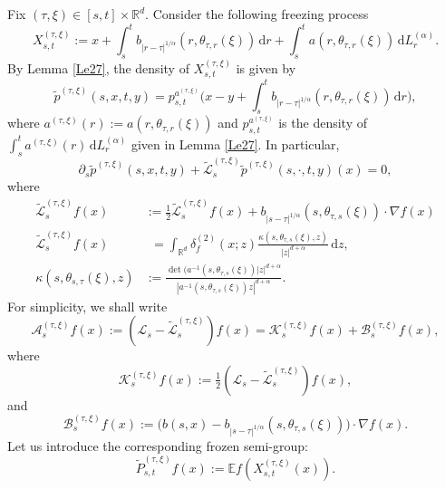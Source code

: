 \documentclass[11pt]{article}
\numberwithin{equation}{section}\providecommand{\asymp}{\mathrel{\sim}}
\theoremstyle{plain}
\theoremstyle{definition}
\let\p\partial
\let\wt\widetilde
\newcommand\cL{{\mathcal L}}
\newcommand\mE{\mathbb{E}}
\newcommand\mR{\mathbb{R}}
\newcommand\1{{\mathbf{1}}}
\newcommand\sA{{\mathscr A}}
\newcommand\sB{{\mathscr B}}
\newcommand\sK{{\mathscr K}}
\newcommand\sL{{\mathscr L}}
\newcommand{\dif}{\,\mathrm{d}}
\begin{document}
Fix $(\tau,\xi)\in[s,t]\times\mR^d$. Consider the following freezing process
\[
X^{(\tau,\xi)}_{s,t}:=x+\int^t_s b_{|r-\tau|^{1/\alpha}}(r, \theta_{\tau,r}(\xi))\dif r+\int^t_s a(r, \theta_{\tau,r}(\xi))\dif L^{(\alpha)}_r.
\]
By Lemma \ref{Le27}, the density of $X^{(\tau,\xi)}_{s,t}$ is given by
\begin{equation}\label{KP8}
\tilde p^{(\tau,\xi)}(s,x,t,y)= p_{s,t}^{a^{(\tau,\xi)}}\biggl(x-y+\int^t_s b_{|r-\tau|^{1/\alpha}}(r, \theta_{\tau,r}(\xi))\dif r\biggr),
\end{equation}
where $a^{(\tau,\xi)}(r):=a(r,\theta_{\tau,r}(\xi)) $ and $p_{s,t}^{a^{(\tau,\xi)}}$ is the density of $\int^t_s a^{(\tau,\xi)}(r)\dif L^{(\alpha)}_r$
given in Lemma \ref{Le27}. In particular,
\begin{equation}\label{KOLMO_FREEZE}
\p_s \tilde p^{(\tau,\xi)}(s,x,t,y)+{\tilde \sL}^{(\tau,\xi)}_s{\tilde p}^{(\tau,\xi)}(s,\cdot,t,y)(x)=0,
\end{equation}
where
\begin{align*}
\tilde \sL^{(\tau,\xi)}_{s} f(x)&:=\tfrac 12\tilde \cL^{(\tau,\xi)}_{s} f(x)+b_{|s-\tau|^{1/\alpha}}(s, \theta_{\tau,s}(\xi))\cdot\nabla f(x)\\
\tag*{and}
\tilde \cL^{(\tau,\xi)}_{s} f(x)&\phantom{:}=\int_{\mR^d}\delta^{(2)}_f(x;z)\frac{\kappa(s,\theta_{\tau,s}(\xi),z)}{|z|^{d+\alpha}}\dif z,\\
\tag*{with}
\kappa(s,\theta_{s,\tau}(\xi),z)&:=\frac{\det(a^{-1}(s,\theta_{\tau,s}(\xi))|z|^{d+\alpha}}{|a^{-1}(s,\theta_{\tau,s}(\xi))z|^{d+\alpha}}.
\end{align*}
For simplicity, we shall write
\begin{equation*}
\sA^{(\tau,\xi)}_{s}f(x):=(\sL_{s}-\tilde \sL^{(\tau,\xi)}_{s})f(x)=\sK^{(\tau,\xi)}_{s}f(x)+\sB^{(\tau,\xi)}_{s}f(x),%
\end{equation*}
where\label{WHERE_K_B_DEFINED}
\begin{equation}\label{SM1}
\sK^{(\tau,\xi)}_{s}f(x):=\tfrac 12(\cL_{s}-\tilde \cL^{(\tau,\xi)}_{s})f(x),
\end{equation}
and
\begin{equation}\label{SM2}
\sB^{(\tau,\xi)}_{s}f(x):=\bigl(b(s,x)-b_{|s-\tau|^{1/\alpha}}(s, \theta_{\tau,s}(\xi))\bigr)\cdot\nabla f(x).
\end{equation}
Let us introduce the corresponding frozen semi-group:
\begin{equation}\label{TPT}
\wt P^{(\tau,\xi)}_{s,t}f(x):=\mE f(X^{(\tau,\xi)}_{s,t}(x)).
\end{equation}
\end{document}
